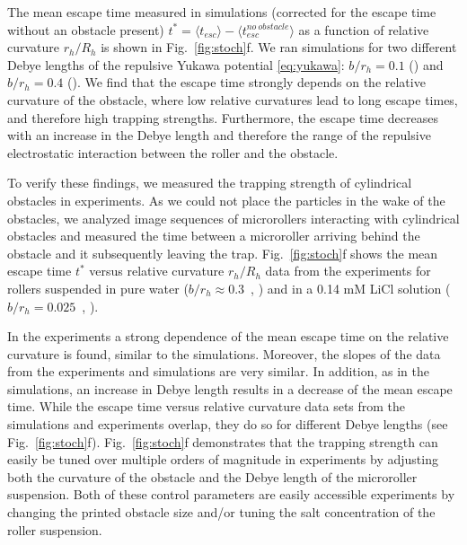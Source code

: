 \documentclass[12pt]{article}
\newcommand{\opencircle}{\raisebox{0.2pt}{\tikz{\node[draw,scale=0.6,circle,fill=none](){};}}}
\newcommand{\opensquare}{\raisebox{0.2pt}{\tikz{\node[draw,scale=0.8,rectangle, fill=none](){};}}}
\newcommand{\opentriangle}{\raisebox{0.2pt}{\tikz{\node[draw,scale=0.4, regular polygon, regular polygon sides=3, color=blue](){};}}}
\newcommand{\opentriangleud}{\raisebox{0.2pt}{\tikz{\node[draw,scale=0.4, regular polygon, regular polygon sides=3, color=blue,rotate=180](){};}}}
\begin{document}
The mean escape time measured in simulations (corrected for the escape time without an obstacle present) $t^* = \langle t_{esc}\rangle - \langle t_{esc}^{no~obstacle} \rangle$\cite{freepassage} as a function of relative curvature $r_h/R_h$ is shown in Fig.~\ref{fig:stoch}f. We ran simulations for two different Debye lengths of the repulsive Yukawa potential \eqref{eq:yukawa}:  $b/r_h=0.1$ (\opentriangle) and $b/r_h=0.4$ (\opentriangleud). We find that the escape time strongly depends on the relative curvature of the obstacle, where low relative curvatures lead to long escape times, and therefore high trapping strengths. 
Furthermore, the escape time decreases with an increase in the Debye length and therefore the range of the repulsive electrostatic interaction between the roller and the obstacle. 

To verify these findings, we measured the trapping strength of cylindrical obstacles in experiments. As we could not place the particles in the wake of the obstacles, we analyzed image sequences of microrollers interacting with cylindrical obstacles and measured the time between a microroller arriving behind the obstacle and it subsequently leaving the trap. Fig.~\ref{fig:stoch}f shows the mean escape time $t^*$ versus relative curvature $r_h/R_h$ data from the experiments for rollers suspended in pure water ($b/r_h \approx 0.3$~\cite{yethiraj2003colloidal}, \opencircle) and in a 0.14 mM LiCl solution ($b/r_h = 0.025$~\cite{sprinkle2020active}, \opensquare).

In the experiments a strong dependence of the mean escape time on the relative curvature is found, similar to the simulations. Moreover, the slopes of the data from the experiments and simulations are very similar. In addition, as in the simulations, an increase in Debye length results in a decrease of the mean escape time. While the escape time versus relative curvature data sets from the simulations and experiments overlap, they do so for different Debye lengths (see Fig.~\ref{fig:stoch}f). Fig.~\ref{fig:stoch}f demonstrates that the trapping strength can easily be tuned over multiple orders of magnitude in experiments by adjusting both the curvature of the obstacle and the Debye length of the microroller suspension. Both of these control parameters are easily accessible experiments by changing the printed obstacle size and/or tuning the salt concentration of the roller suspension.
\end{document}
